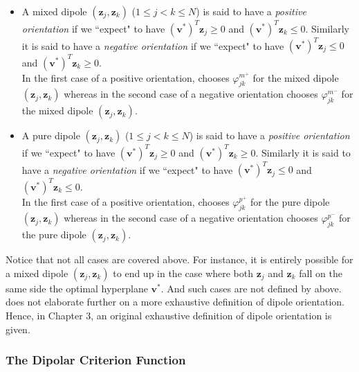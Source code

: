 \documentclass[12pt]{amsart}
\theoremstyle{definition}
\theoremstyle{plain}
\theoremstyle{remark}
\begin{document}
\begin{itemize}
	\item A mixed dipole $(\mathbf{z}_j, \mathbf{z}_k)$ ($1 \leq j < k \leq N$) is said to have a \emph{positive orientation} if we ``expect" \cite{kretowska} to have $(\mathbf{v}^\ast)^T \mathbf{z}_j \geq 0$ and $(\mathbf{v}^\ast)^T \mathbf{z}_k \leq 0$. Similarly it is said to have a \emph{negative orientation} if we ``expect" \cite{kretowska} to have $(\mathbf{v}^\ast)^T \mathbf{z}_j \leq 0$ and $(\mathbf{v}^\ast)^T \mathbf{z}_k \geq 0$. \\
	
	In the first case of a positive orientation, \cite{kretowska} chooses $\varphi^{m^+}_{jk}$ for the mixed dipole $(\mathbf{z}_j, \mathbf{z}_k)$ whereas in the second case of a negative orientation  \cite{kretowska} chooses $\varphi^{m^-}_{jk}$ for the mixed dipole $(\mathbf{z}_j, \mathbf{z}_k)$. \\
	
	\item A pure dipole $(\mathbf{z}_j, \mathbf{z}_k)$ ($1 \leq j < k \leq N$) is said to have a \emph{positive orientation} if we ``expect" \cite{kretowska} to have $(\mathbf{v}^\ast)^T \mathbf{z}_j \geq 0$ and $(\mathbf{v}^\ast)^T \mathbf{z}_k \geq 0$. Similarly it is said to have a \emph{negative orientation} if we ``expect" \cite{kretowska} to have $(\mathbf{v}^\ast)^T \mathbf{z}_j \leq 0$ and $(\mathbf{v}^\ast)^T \mathbf{z}_k \leq 0$. \\
	
	In the first case of a positive orientation, \cite{kretowska} chooses $\varphi^{p^+}_{jk}$ for the pure dipole $(\mathbf{z}_j, \mathbf{z}_k)$ whereas in the second case of a negative orientation  \cite{kretowska} chooses $\varphi^{p^-}_{jk}$ for the pure dipole $(\mathbf{z}_j, \mathbf{z}_k)$. \\
\end{itemize} Notice that not all cases are covered above. For instance, it is entirely possible for a mixed dipole $(\mathbf{z}_j, \mathbf{z}_k)$ to end up in the case where both $\mathbf{z}_j$ and $\mathbf{z}_k$ fall on the same side the optimal hyperplane $\mathbf{v}^\ast$. And such cases are not defined by \cite{kretowska} above. \cite{kretowska} does not elaborate further on a more exhaustive definition of dipole orientation. Hence, in Chapter 3, an original exhaustive definition of dipole orientation is given.


\subsubsection{The Dipolar Criterion Function} \hfill \\
\end{document}
